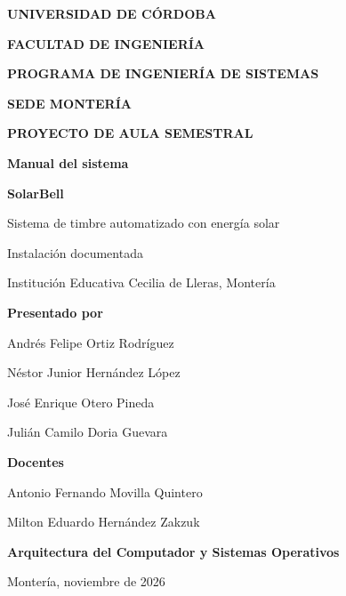 \documentclass[a4paper,11pt]{article}
\begin{document}
\begin{titlepage}
  \centering
  \vspace*{1.15cm}
  {\large\bfseries UNIVERSIDAD DE CÓRDOBA\par}
  \vspace{0.24cm}
  {\bfseries FACULTAD DE INGENIERÍA\par}
  \vspace{0.20cm}
  {\bfseries PROGRAMA DE INGENIERÍA DE SISTEMAS\par}
  \vspace{0.20cm}
  {\bfseries SEDE MONTERÍA\par}
  \vfill
  {\large\bfseries PROYECTO DE AULA SEMESTRAL\par}
  \vspace{0.9cm}
  {\Huge\bfseries\color{navy} Manual del sistema\par}
  \vspace{0.25cm}
  {\LARGE\bfseries SolarBell\par}
  \vspace{0.38cm}
  {\large Sistema de timbre automatizado con energía solar\par}
  \vspace{0.7cm}
  {\color{greytext}Instalación documentada\par
  Institución Educativa Cecilia de Lleras, Montería\par}
  \vfill
  {\bfseries Presentado por\par}
  \vspace{0.28cm}
  Andrés Felipe Ortiz Rodríguez\par
  Néstor Junior Hernández López\par
  José Enrique Otero Pineda\par
  Julián Camilo Doria Guevara\par
  \vfill
  {\bfseries Docentes\par}
  \vspace{0.27cm}
  Antonio Fernando Movilla Quintero\par
  Milton Eduardo Hernández Zakzuk\par
  \vfill
  {\bfseries Arquitectura del Computador y Sistemas Operativos\par}
  \vspace{0.28cm}
  Montería, noviembre de 2026\par
  \vspace*{0.2cm}
\end{titlepage}

\tableofcontents
\end{document}
